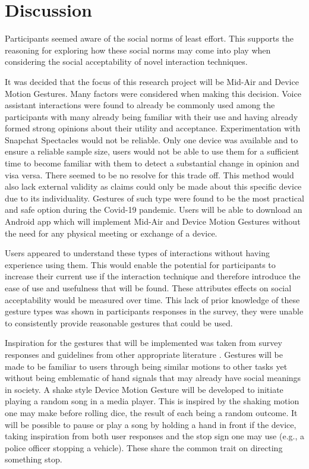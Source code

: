 \documentclass{l4proj}
\begin{document}
\section{Discussion}

Participants seemed aware of the social norms of least effort. This supports the reasoning for exploring how these social norms may come into play when considering the social acceptability of novel interaction techniques.

It was decided that the focus of this research project will be Mid-Air and Device Motion Gestures. Many factors were considered when making this decision. Voice assistant interactions were found to already be commonly used among the participants with many already being familiar with their use and having already formed strong opinions about their utility and acceptance. Experimentation with Snapchat Spectacles would not be reliable. Only one device was available and to ensure a reliable sample size, users would not be able to use them for a sufficient time to become familiar with them to detect a substantial change in opinion and visa versa. There seemed to be no resolve for this trade off. This method would also lack external validity as claims could only be made about this specific device due to its individuality. Gestures of such type were found to be the most practical and safe option during the Covid-19 pandemic. Users will be able to download an Android app which will implement Mid-Air and Device Motion Gestures without the need for any physical meeting or exchange of a device. 

Users appeared to understand these types of interactions without having experience using them. This would enable the potential for participants to increase their current use if the interaction technique and therefore introduce the ease of use and usefulness that will be found. These attributes effects on social acceptability would be measured over time. This lack of prior knowledge of these gesture types was shown in participants responses in the survey, they were unable to consistently provide reasonable gestures that could be used. 

Inspiration for the gestures that will be implemented was taken from survey responses and guidelines from other appropriate literature \citep{rico_usable_2010}. Gestures will be made to be familiar to users through being similar motions to other tasks yet without being emblematic of hand signals that may already have social meanings in society. A shake style Device Motion Gesture will be developed to initiate playing a random song in a media player. This is inspired by the shaking motion one may make before rolling dice, the result of each being a random outcome. It will be possible to pause or play a song by holding a hand in front if the device, taking inspiration from both user responses and the stop sign one may use (e.g., a police officer stopping a vehicle). These share the common trait on directing something stop.
\end{document}
